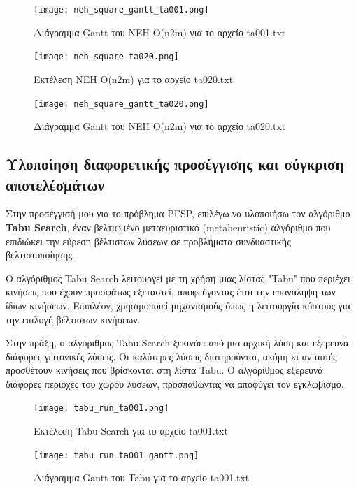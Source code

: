 \documentclass[paper=a4, fontsize=11pt]{scrartcl}
\numberwithin{equation}{section}		%
\numberwithin{figure}{section}			%
\numberwithin{table}{section}				%
\begin{document}
\begin{figure}[H]
   \centering
   \texttt{[image: neh\_square\_gantt\_ta001.png]}
   \caption{Διάγραμμα Gantt του NEH O(n2m) για το αρχείο ta001.txt}
   \label{fig:squarG_ta001}
\end{figure} 

\begin{figure}[H]
   \centering
   \texttt{[image: neh\_square\_ta020.png]}
   \caption{Εκτέλεση NEH O(n2m)  για το αρχείο ta020.txt}
   \label{fig:squar_ta020}
\end{figure} 

\begin{figure}[H]
   \centering
   \texttt{[image: neh\_square\_gantt\_ta020.png]}
   \caption{Διάγραμμα Gantt του NEH O(n2m) για το αρχείο ta020.txt}
   \label{fig:squarG_ta020}
\end{figure} 


\newpage
\subsection{Υλοποίηση διαφορετικής προσέγγισης και σύγκριση αποτελέσμάτων}

    Στην προσέγγισή μου για το πρόβλημα PFSP, επιλέγω να υλοποιήσω τον αλγόριθμο \textbf{Tabu Search}, έναν βελτιωμένο μεταευριστικό (metaheuristic) αλγόριθμο που επιδιώκει την εύρεση βέλτιστων λύσεων σε προβλήματα συνδυαστικής βελτιστοποίησης.
    
    Ο αλγόριθμος Tabu Search λειτουργεί με τη χρήση μιας λίστας "Tabu" που περιέχει κινήσεις που έχουν προσφάτως εξεταστεί, αποφεύγοντας έτσι την επανάληψη των ίδιων κινήσεων. Επιπλέον, χρησιμοποιεί μηχανισμούς όπως η λειτουργία κόστους για την επιλογή βέλτιστων κινήσεων.
    
    Στην πράξη, ο αλγόριθμος Tabu Search ξεκινάει από μια αρχική λύση και εξερευνά διάφορες γειτονικές λύσεις. Οι καλύτερες λύσεις διατηρούνται, ακόμη κι αν αυτές προσθέτουν κινήσεις που βρίσκονται στη λίστα Tabu. Ο αλγόριθμος εξερευνά διάφορες περιοχές του χώρου λύσεων, προσπαθώντας να αποφύγει τον εγκλωβισμό.

\begin{figure}[H]
   \centering
   \texttt{[image: tabu\_run\_ta001.png]}
   \caption{Εκτέλεση Tabu Search  για το αρχείο ta001.txt}
   \label{fig:tabu_ta001}
\end{figure} 

\begin{figure}[H]
   \centering
   \texttt{[image: tabu\_run\_ta001\_gantt.png]}
   \caption{Διάγραμμα Gantt του Tabu  για το αρχείο ta001.txt}
   \label{fig:tabu_ta001}
\end{figure}
\end{document}
